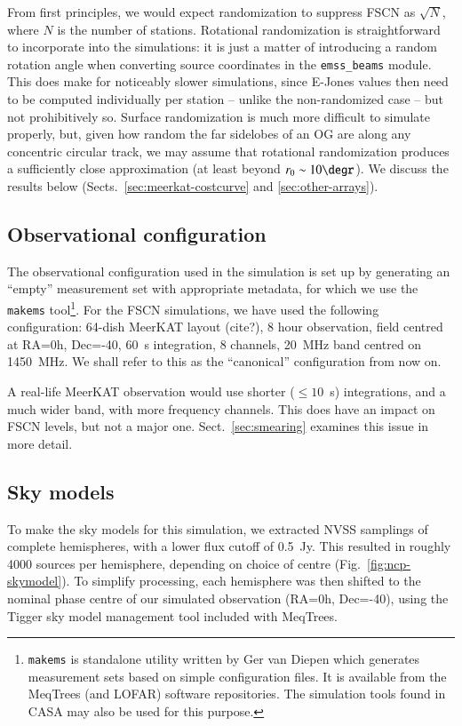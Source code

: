 \documentclass{aa}
\begin{document}
From first principles, we would expect randomization to suppress FSCN as $\sqrt{N}$, where $N$ is the number of stations. Rotational randomization is straightforward to incorporate into the simulations: it is just a matter of introducing a random rotation angle when converting source coordinates in the {\tt emss\_beams} module. This does make for noticeably slower simulations, since E-Jones values then need to be computed individually per station -- unlike the non-randomized case -- but not prohibitively so. Surface randomization is much more difficult to simulate properly, but, given how random the far sidelobes of an OG are along any concentric circular track, we may assume that rotational randomization produces a sufficiently close approximation (at least beyond $r_0\sim10\degr$). We discuss the results below (Sects.~\ref{sec:meerkat-costcurve} and \ref{sec:other-arrays}).

\subsection{Observational configuration}
\label{sec:config}

The observational configuration used in the simulation is set up by generating an ``empty'' measurement set with appropriate metadata, for which we use the {\tt makems} tool\footnote{{\tt makems} is standalone utility written by Ger van Diepen which generates measurement sets based on simple configuration files. It is available from the MeqTrees (and LOFAR) software repositories. The simulation tools found in CASA may also be used for this purpose.}. For the FSCN simulations, we have used the following configuration: 64-dish MeerKAT layout (cite?), 8 hour observation, field centred at RA=0h, Dec=-40\degr, 60~s integration, 8 channels, 20~MHz band centred on 1450~MHz. We shall refer to this as the ``canonical'' configuration from now on.

A real-life MeerKAT observation would use shorter ($\leq10$~s) integrations, and a much wider band, with more frequency channels. This does have an impact on FSCN levels, but not a major one. Sect.~\ref{sec:smearing} examines this issue in more detail.

\subsection{Sky models}

To make the sky models for this simulation, we extracted NVSS samplings of complete hemispheres, with a lower flux cutoff of 0.5~Jy. This resulted in roughly 4000 sources per hemisphere, depending on choice of centre (Fig.~\ref{fig:ncp-skymodel}). To simplify processing, each hemisphere was then shifted to the nominal phase centre of our simulated observation (RA=0h, Dec=-40\degr), using the Tigger sky model management tool included with MeqTrees.
\end{document}
